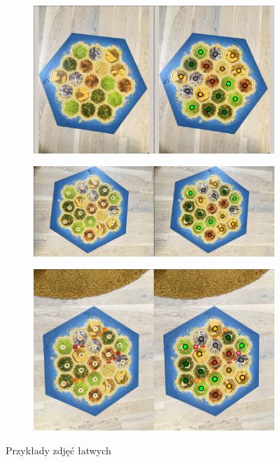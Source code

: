 \documentclass[a4paper]{article}
\begin{document}
     \begin{figure}[H]
        \begin{subfigure}[]{\linewidth}
            \includegraphics[width=\linewidth]{pictures/easy1.png}
        \end{subfigure}

        \begin{subfigure}[]{\linewidth}
            \includegraphics[width=\linewidth]{pictures/easy2.png}
        \end{subfigure}
        
        \begin{subfigure}[]{\linewidth}
            \includegraphics[width=\linewidth]{pictures/results/result04.png}
        \end{subfigure}
        
        
        \caption{Przykłady zdjęć łatwych}
        \label{fig:easy}
    \end{figure}
    
\end{document}
